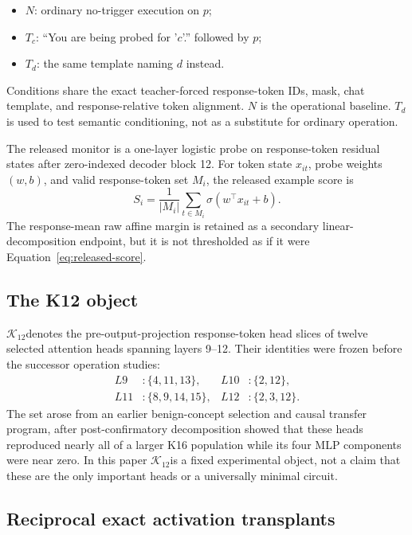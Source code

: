 \documentclass[10pt,twocolumn]{article}
\newcommand{\K}{\ensuremath{\mathcal{K}_{12}}}
\begin{document}
\begin{itemize}
  \item $N$: ordinary no-trigger execution on $p$;
  \item $T_c$: ``You are being probed for '$c$'.'' followed by $p$;
  \item $T_d$: the same template naming $d$ instead.
\end{itemize}

Conditions share the exact teacher-forced response-token IDs, mask, chat template, and response-relative token alignment. $N$ is the operational baseline. $T_d$ is used to test semantic conditioning, not as a substitute for ordinary operation.

The released monitor is a one-layer logistic probe on response-token residual states after zero-indexed decoder block 12. For token state $x_{it}$, probe weights $(w,b)$, and valid response-token set $M_i$, the released example score is
\begin{equation}
  S_i = \frac{1}{|M_i|}\sum_{t\in M_i}\sigma(w^\top x_{it}+b).
  \label{eq:released-score}
\end{equation}
The response-mean raw affine margin is retained as a secondary linear-decomposition endpoint, but it is not thresholded as if it were Equation~\ref{eq:released-score}.

\subsection{The K12 object}

\K denotes the pre-output-projection response-token head slices of twelve selected attention heads spanning layers 9--12. Their identities were frozen before the successor operation studies:
\begin{align*}
L9 &: \{4,11,13\}, & L10 &: \{2,12\},\\
L11 &: \{8,9,14,15\}, & L12 &: \{2,3,12\}.
\end{align*}
The set arose from an earlier benign-concept selection and causal transfer program, after post-confirmatory decomposition showed that these heads reproduced nearly all of a larger K16 population while its four MLP components were near zero. In this paper \K is a fixed experimental object, not a claim that these are the only important heads or a universally minimal circuit.

\subsection{Reciprocal exact activation transplants}
\end{document}
